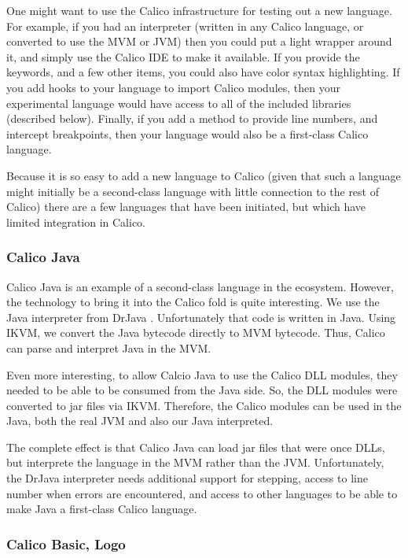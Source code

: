 \documentclass[preprint]{sigplanconf}
\begin{document}
One might want to use the Calico infrastructure for testing out a new
language. For example, if you had an interpreter (written in any
Calico language, or converted to use the MVM or JVM) then you could
put a light wrapper around it, and simply use the Calico IDE to make
it available. If you provide the keywords, and a few other items, you
could also have color syntax highlighting. If you add hooks to your
language to import Calico modules, then your experimental language
would have access to all of the included libraries (described
below). Finally, if you add a method to provide line numbers, and
intercept breakpoints, then your language would also be a first-class
Calico language.

Because it is so easy to add a new language to Calico (given that such
a language might initially be a second-class language with little
connection to the rest of Calico) there are a few languages that have
been initiated, but which have limited integration in Calico.

\subsubsection{Calico Java}

Calico Java is an example of a second-class language in the
ecosystem. However, the technology to bring it into the Calico fold is
quite interesting. We use the Java interpreter from DrJava
\cite{drjava}. Unfortunately that code is written in Java. Using IKVM,
we convert the Java bytecode directly to MVM bytecode. Thus, Calico can parse
and interpret Java in the MVM.

Even more interesting, to allow Calcio Java to use the Calico DLL modules,
they needed to be able to be consumed from the Java side. So, the DLL
modules were converted to jar files via IKVM. Therefore, the Calico
modules can be used in the Java, both the real JVM and also our Java
interpreted.

The complete effect is that Calico Java can load jar files that were
once DLLs, but interprete the language in the MVM rather than the
JVM. Unfortunately, the DrJava interpreter needs additional support
for stepping, access to line number when errors are encountered, and
access to other languages to be able to make Java a first-class Calico
language.

\subsubsection{Calico Basic, Logo}
\end{document}
